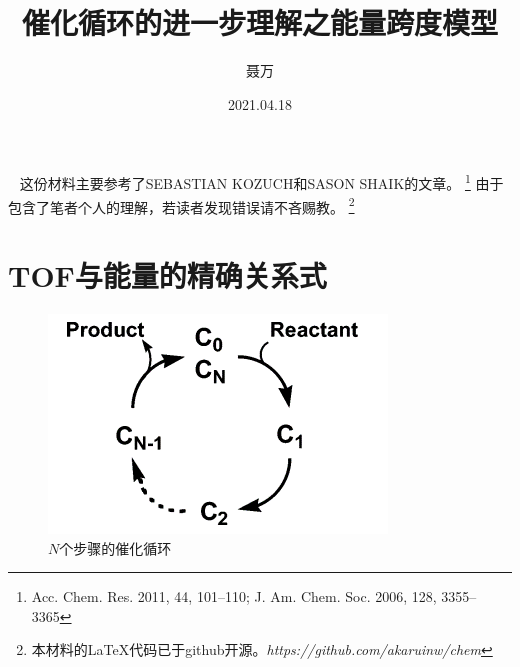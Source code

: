 \documentclass[a4paper,titlepage]{article}
\title{催化循环的进一步理解之能量跨度模型}
\author{聂万}
\date{2021.04.18}
\begin{document}
{
\let\clearpage\relax
\maketitle
}

\
\vfil
\hfil
这份材料主要参考了SEBASTIAN KOZUCH和SASON SHAIK的文章。
\footnote{Acc. Chem. Res. 2011, 44, 101–110;
J. Am. Chem. Soc. 2006, 128, 3355–3365}
由于包含了笔者个人的理解，若读者发现错误请不吝赐教。
\footnote{本材料的\LaTeX{}代码已于github开源。\textit{https://github.com/akaruinw/chem}}
\hfil
\vfil

\newpage
\section*{TOF与能量的精确关系式}
\begin{figure}[h]
  \centering
  \includegraphics{N_steps}
  \caption{$N$个步骤的催化循环}
  \label{fig:N stepts}  %
\end{figure}
\end{document}
